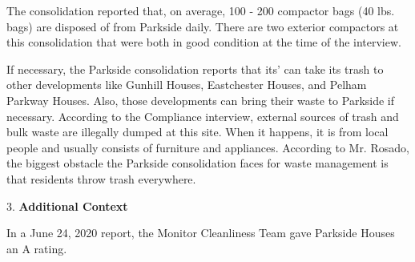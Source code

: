 The consolidation reported that, on average, 100 -  200 compactor bags (40 lbs. bags) are disposed of from Parkside daily. There are two exterior compactors at this consolidation that were both in good condition at the time of the interview. 

If necessary, the Parkside consolidation reports that its' can take its trash to other developments like Gunhill Houses, Eastchester Houses, and Pelham Parkway Houses. Also, those developments can bring their waste to Parkside if necessary. According to the Compliance interview, external sources of trash and bulk waste are illegally dumped at this site. When it happens, it is from local people and usually consists of furniture and appliances. According to Mr. Rosado, the biggest obstacle the Parkside consolidation faces for waste management is that residents throw trash everywhere.  

3. \textbf{Additional Context} 

In a June 24, 2020 report, the Monitor Cleanliness Team gave Parkside Houses an A rating.